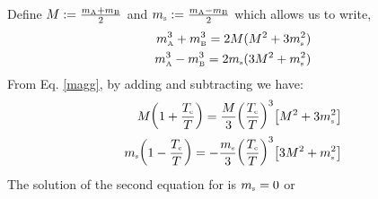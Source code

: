 Define $M := \frac{m\tund{A}+m\tund{B}}{2}$ and $m\tund{s} := \frac{m\tund{A}-m\tund{B}}{2}$ which allows us to write,
\begin{equation}
    \begin{split}
        m_{\text{\tiny A}}^3+m_{\text{\tiny B}}^3 = 2M(M^2 +3m_{\text{\tiny s}}^2)\\
         m_{\text{\tiny A}}^3-m_{\text{\tiny B}}^3 = 2m_{\text{\tiny s}}(3M^2 +m_{\text{\tiny s}}^2)
    \end{split}
\end{equation}
From Eq. \eqref{magg}, by adding and subtracting we have: 
\begin{align}
    \begin{split}
        M\qty(1+\frac{T_{\text{\tiny c}}}{T}) = \frac{M}{3}\qty(\frac{T_{\text{\tiny c}}}{T})^3\qty[M^2+3m_{\text{\tiny s}}^2]\\
        m_{\text{\tiny s}}\qty(1-\frac{T_{\text{\tiny c}}}{T}) = -\frac{m_{\text{\tiny s}}}{3}\qty(\frac{T_{\text{\tiny c}}}{T})^3\qty[3M^2+m_{\text{\tiny s}}^2]
    \end{split}
\end{align}
The solution of the second equation for  is $m\tund{s} =0 $ or $$